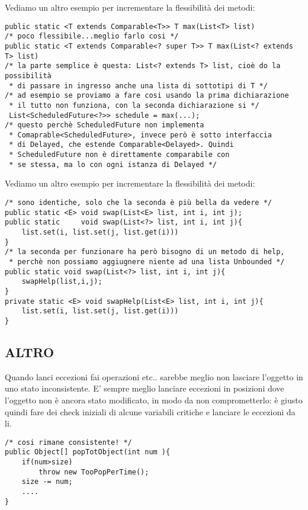 \noindent Vediamo un altro esempio per incrementare la flessibilità dei metodi:
\begin{lstlisting}
public static <T extends Comparable<T>> T max(List<T> list)
/* poco flessibile...meglio farlo cosi */
public static <T extends Comparable<? super T>> T max(List<? extends T> list)
/* la parte semplice è questa: List<? extends T> list, cioè do la possibilità
 * di passare in ingresso anche una lista di sottotipi di T */
/* ad esempio se proviamo a fare cosi usando la prima dichiarazione
 * il tutto non funziona, con la seconda dichiarazione si */
 List<ScheduledFuture<?>> schedule = max(...);
/* questo perchè ScheduledFuture non implementa 
 * Comaprable<ScheduledFuture>, invece però è sotto interfaccia 
 * di Delayed, che estende Comparable<Delayed>. Quindi
 * ScheduledFuture non è direttamente comparabile con
 * se stessa, ma lo con ogni istanza di Delayed */
\end{lstlisting}




\noindent Vediamo un altro esempio per incrementare la flessibilità dei metodi:
\begin{lstlisting}
/* sono identiche, solo che la seconda è più bella da vedere */
public static <E> void swap(List<E> list, int i, int j);
public static     void swap(List<?> list, int i, int j){
	list.set(i, list.set(j, list.get(i)))
}
/* la seconda per funzionare ha però bisogno di un metodo di help,
 * perchè non possiamo aggiugnere niente ad una lista Unbounded */
public static void swap(List<?> list, int i, int j){
	swapHelp(list,i,j);
}
private static <E> void swapHelp(List<E> list, int i, int j){
	list.set(i, list.set(j, list.get(i)))
}
\end{lstlisting}
\subsection{ALTRO}
\noindent Quando lanci eccezioni fai operazioni etc.. sarebbe meglio non lasciare l'oggetto in uno stato inconsistente. E' sempre meglio lanciare eccezioni in posizioni dove l'oggetto non è ancora stato modificato, in modo da non comprometterlo: è giusto quindi fare dei check iniziali di alcune variabili critiche e lanciare le eccezioni da li. 
\begin{lstlisting}
/* cosi rimane consistente! */
public Object[] popTotObject(int num ){
	if(num>size)
		throw new TooPopPerTime();
	size -= num;
	....
}
\end{lstlisting}